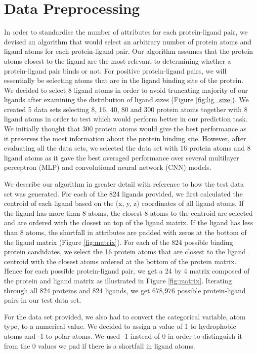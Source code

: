 \documentclass[11pt]{article}
\begin{document}
\section{Data Preprocessing}
In order to standardise the number of attributes for each protein-ligand pair, we devised an algorithm that would select an arbitrary number of protein atoms and ligand atoms for each protein-ligand pair. Our algorithm assumes that the protein atoms closest to the ligand are the most relevant to determining whether a protein-ligand pair binds or not. For positive protein-ligand pairs, we will essentially be selecting atoms that are in the ligand binding site of the protein. We decided to select 8 ligand atoms in order to avoid truncating majority of our ligands after examining the distribution of ligand sizes (Figure \ref{fig:lig_size}). We created 5 data sets selecting 8, 16, 40, 80 and 300 protein atoms together with 8 ligand atoms in order to test which would perform better in our prediction task. We initially thought that 300 protein atoms would give the best performance as it preserves the most information about the protein binding site. However, after evaluating all the data sets, we selected the data set with 16 protein atoms and 8 ligand atoms as it gave the best averaged performance over several multilayer perceptron (MLP) and convolutional neural network (CNN) models.

We describe our algorithm in greater detail with reference to how the test data set was generated. For each of the 824 ligands provided, we first calculated the centroid of each ligand based on the (x, y, z) coordinates of all ligand atoms. If the ligand has more than 8 atoms, the closest 8 atoms to the centroid are selected and are ordered with the closest on top of the ligand matrix. If the ligand has less than 8 atoms, the shortfall in attributes are padded with zeros at the bottom of the ligand matrix (Figure \ref{fig:matrix}). For each of the 824 possible binding protein candidates, we select the 16 protein atoms that are closest to the ligand centroid with the closest atoms ordered at the bottom of the protein matrix. Hence for each possible protein-ligand pair, we get a 24 by 4 matrix composed of the protein and ligand matrix as illustrated in Figure \ref{fig:matrix}. Iterating through all 824 proteins and 824 ligands, we get 678,976 possible protein-ligand pairs in our test data set.

For the data set provided, we also had to convert the categorical variable, atom type, to a numerical value. We decided to assign a value of 1 to hydrophobic atoms and -1 to polar atoms. We used -1 instead of 0 in order to distinguish it from the 0 values we pad if there is a shortfall in ligand atoms.
\end{document}
